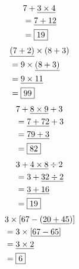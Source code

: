 \documentclass[../Cours.tex]{subfiles}
\begin{document}
\begin{questions}
        \question 
        \begin{align*}
            &7 + \underline{3 \times 4}\\
            &= \underline{7 + 12} \\
            &= \fbox{19}
        \end{align*}
        \question 
        \begin{align*}
            &\underline{(7+2)} \times (8+3) \\
            &= 9 \times \underline{(8+3)} \\
            &= \underline{9 \times 11} \\
            &= \fbox{99}
        \end{align*}
        \question 
        \begin{align*}
            &7 + \underline{8 \times 9} + 3 \\
            &= \underline{7 + 72} + 3 \\
            &= \underline{79 + 3} \\
            &= \fbox{82}
        \end{align*}
        \question 
        \begin{align*}
            &3 + \underline{4 \times 8} \div 2 \\
            &= 3 + \underline{32 \div 2} \\
            &= \underline{3 + 16} \\
            &= \fbox{19}
        \end{align*}
        \question 
        \begin{align*}
            &3 \times \left[ 67 - \left( \underline{20 + 45} \right) \right] \\
            &= 3 \times \left[ \underline{67 - 65} \right] \\ 
            &= \underline{3 \times 2} \\
            &= \fbox{6}
        \end{align*}


\end{questions}
\end{document}
